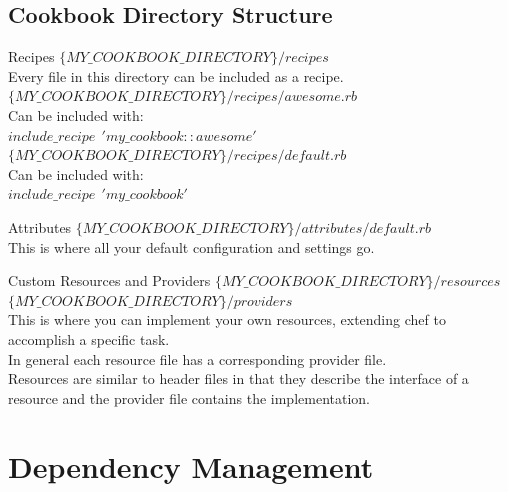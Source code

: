 \documentclass{beamer}
\begin{document}
    \subsection{Cookbook Directory Structure}
    \begin{frame}{Recipes}
        $\{MY\_COOKBOOK\_DIRECTORY\}/recipes$\\
        Every file in this directory can be included as a recipe.\\
        \bigskip
        $\{MY\_COOKBOOK\_DIRECTORY\}/recipes/awesome.rb$\\
        Can be included with:\\
        $include\_recipe~~'my\_cookbook::awesome'$\\
        \bigskip
        $\{MY\_COOKBOOK\_DIRECTORY\}/recipes/default.rb$\\
        Can be included with:\\
        $include\_recipe~~'my\_cookbook'$\\
    \end{frame}
    \begin{frame}{Attributes}
        $\{MY\_COOKBOOK\_DIRECTORY\}/attributes/default.rb$\\
        This is where all your default configuration and settings go.\\
    \end{frame}
    \begin{frame}{Custom Resources and Providers}
        $\{MY\_COOKBOOK\_DIRECTORY\}/resources$\\
        $\{MY\_COOKBOOK\_DIRECTORY\}/providers$\\
        \bigskip
        This is where you can implement your own resources, extending chef to accomplish a specific task.\\
        \bigskip
        In general each resource file has a corresponding provider file.\\
        \bigskip
        Resources are similar to header files in that they describe the interface of a resource and the provider file contains the implementation.\\
    \end{frame}
    \section{Dependency Management}
\end{document}
